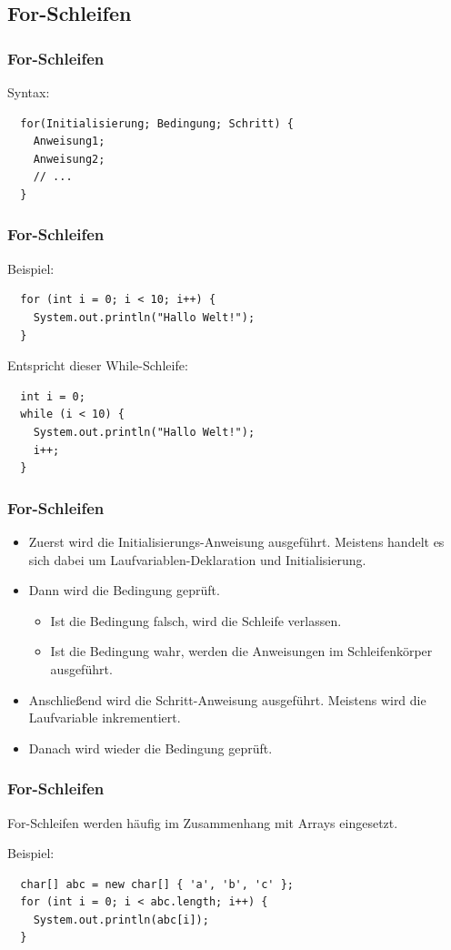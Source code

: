 \documentclass[final]{beamer}
\begin{document}
\subsection{For-Schleifen}
\begin{frame}[containsverbatim]
  \frametitle{For-Schleifen}
  Syntax:
  \begin{lstlisting}
  for(Initialisierung; Bedingung; Schritt) {
	Anweisung1;
	Anweisung2;
	// ...
  }
  \end{lstlisting}
\end{frame}
\begin{frame}[containsverbatim]
  \frametitle{For-Schleifen}
  Beispiel:
  \begin{lstlisting}
  for (int i = 0; i < 10; i++) {
	System.out.println("Hallo Welt!");
  }
  \end{lstlisting}
  Entspricht dieser While-Schleife:
  \begin{lstlisting}
  int i = 0;
  while (i < 10) {
	System.out.println("Hallo Welt!");
	i++;
  }
  \end{lstlisting}
\end{frame}
\begin{frame}
  \frametitle{For-Schleifen}
  \begin{itemize}
	\item{Zuerst wird die Initialisierungs-Anweisung ausgeführt.
	  {\small Meistens handelt es sich dabei um Laufvariablen-Deklaration und Initialisierung.}
	  }
	  \item{Dann wird die Bedingung geprüft.
		\begin{itemize}
		  \item{Ist die Bedingung falsch, wird die Schleife verlassen.}
		  \item{Ist die Bedingung wahr, werden die Anweisungen im Schleifenkörper ausgeführt.}
		\end{itemize}}
	  \item{Anschließend wird die Schritt-Anweisung ausgeführt.
		{\small Meistens wird die Laufvariable inkrementiert.}
		}
	  \item{Danach wird wieder die Bedingung geprüft.}
  \end{itemize}
\end{frame}
\begin{frame}[containsverbatim]
  \frametitle{For-Schleifen}
  For-Schleifen werden häufig im Zusammenhang mit Arrays eingesetzt.

  Beispiel:
  \begin{lstlisting}
  char[] abc = new char[] { 'a', 'b', 'c' };
  for (int i = 0; i < abc.length; i++) {
	System.out.println(abc[i]);
  }
  \end{lstlisting}
\end{frame}
\end{document}
